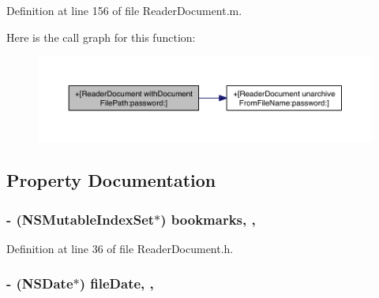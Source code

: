 Definition at line 156 of file Reader\-Document.\-m.



Here is the call graph for this function\-:
\nopagebreak
\begin{figure}[H]
\begin{center}
\leavevmode
\includegraphics[width=350pt]{dc/d78/interface_reader_document_a45e97f0c02ba91018b7ccac3b8b5d255_cgraph}
\end{center}
\end{figure}




\subsection{Property Documentation}
\hypertarget{interface_reader_document_aeb8333eda0eee2c0a48a43e2766ae31a}{
\subsubsection[{bookmarks}]{\setlength{\rightskip}{0pt plus 5cm}-\/ (N\-S\-Mutable\-Index\-Set$\ast$) bookmarks\hspace{0.3cm}{\ttfamily [read]}, {\ttfamily [nonatomic]}, {\ttfamily [strong]}}}\label{dc/d78/interface_reader_document_aeb8333eda0eee2c0a48a43e2766ae31a}


Definition at line 36 of file Reader\-Document.\-h.

\hypertarget{interface_reader_document_adb6d224fb441a753e3f90baf4477c884}{
\subsubsection[{file\-Date}]{\setlength{\rightskip}{0pt plus 5cm}-\/ (N\-S\-Date$\ast$) file\-Date\hspace{0.3cm}{\ttfamily [read]}, {\ttfamily [nonatomic]}, {\ttfamily [strong]}}}\label{dc/d78/interface_reader_document_adb6d224fb441a753e3f90baf4477c884}


